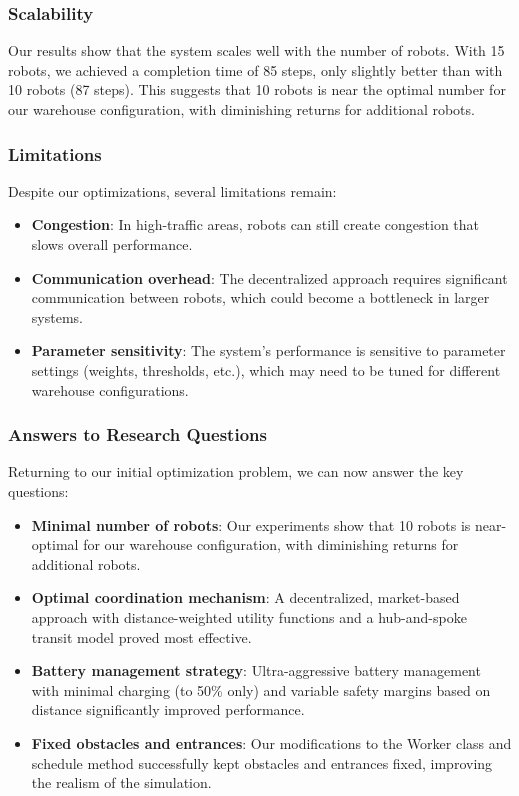 \documentclass[12pt,a4paper]{article}
\begin{document}
\subsubsection{Scalability}
Our results show that the system scales well with the number of robots. With 15 robots, we achieved a completion time of 85 steps, only slightly better than with 10 robots (87 steps). This suggests that 10 robots is near the optimal number for our warehouse configuration, with diminishing returns for additional robots.

\subsubsection{Limitations}
Despite our optimizations, several limitations remain:

\begin{itemize}
    \item \textbf{Congestion}: In high-traffic areas, robots can still create congestion that slows overall performance.

    \item \textbf{Communication overhead}: The decentralized approach requires significant communication between robots, which could become a bottleneck in larger systems.

    \item \textbf{Parameter sensitivity}: The system's performance is sensitive to parameter settings (weights, thresholds, etc.), which may need to be tuned for different warehouse configurations.
\end{itemize}

\subsubsection{Answers to Research Questions}
Returning to our initial optimization problem, we can now answer the key questions:

\begin{itemize}
    \item \textbf{Minimal number of robots}: Our experiments show that 10 robots is near-optimal for our warehouse configuration, with diminishing returns for additional robots.

    \item \textbf{Optimal coordination mechanism}: A decentralized, market-based approach with distance-weighted utility functions and a hub-and-spoke transit model proved most effective.

    \item \textbf{Battery management strategy}: Ultra-aggressive battery management with minimal charging (to 50\% only) and variable safety margins based on distance significantly improved performance.

    \item \textbf{Fixed obstacles and entrances}: Our modifications to the Worker class and schedule method successfully kept obstacles and entrances fixed, improving the realism of the simulation.
\end{itemize}
\end{document}
